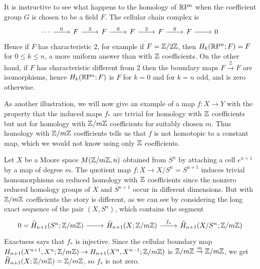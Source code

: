 \begin{example}
It is instructive to see what happens to the homology of $\mathbb{R}\mathrm{P}^n$ when the coefficient group $G$ is chosen to be a field $F$. The cellular chain complex is
\[\begin{tikzcd}
\cdots\ar[r,"0"]&F\ar[r,"2"]&F\ar[r,"0"]&F\ar[r,"2"]&F\ar[r,"0"]&F\ar[r]&0
\end{tikzcd}\]
Hence if $F$ has characteristic $2$, for example if $F=\mathbb{Z}/2\mathbb{Z}$, then $H_k(\mathbb{R}\mathrm{P}^n;F)=F$ for $0\leq k\leq n$, a more uniform answer than with $\mathbb{Z}$ coefficients. On the other hand, if $F$ has characteristic different from $2$ then the boundary maps $F\stackrel{2}{\to}F$ are isomorphisms, hence $H_k(\mathbb{R}\mathrm{P}^n;F)$ is $F$ for $k=0$ and for $k=n$ odd, and is zero otherwise.
\end{example}
As another illustration, we will now give an example of a map $f:X\to Y$ with the property that the induced maps $f_*$ are trivial for homology with $\mathbb{Z}$ coefficients but not for homology with $\mathbb{Z}/m\mathbb{Z}$ coefficients for suitably chosen $m$. Thus homology with $\mathbb{Z}/m\mathbb{Z}$ coefficients tells us that $f$ is not homotopic to a constant map, which we would not know using only $\mathbb{Z}$ coefficients.
\begin{example}
Let $X$ be a Moore space $M(\mathbb{Z}/m\mathbb{Z},n)$ obtained from $S^n$ by attaching a cell $e^{n+1}$ by a map of degree $m$. The quotient map $f:X\to X/S^n=S^{n+1}$ induces trivial homomorphisms on reduced homology with $\mathbb{Z}$ coefficients since the nonzero reduced homology groups of $X$ and $S^{n+1}$ occur in different dimensions. But with $\mathbb{Z}/m\mathbb{Z}$ coefficients the story is different, as we can see by considering the long exact sequence of the pair $(X,S^n)$, which contains the segment
\[\begin{tikzcd}
0=\widetilde{H}_{n+1}(S^n;\Z/m\Z)\ar[r]&\widetilde{H}_{n+1}(X;\Z/m\Z)\ar[r,"f_*"]&\widetilde{H}_{n+1}(X/S^n;\Z/m\Z)
\end{tikzcd}\]
Exactness says that $f_*$ is injective. Since the cellular boundary map $H_{n+1}(X^{n+1},X^n;\mathbb{Z}/m\mathbb{Z})\to H_{n+1}(X^{n},X^{n-1};\mathbb{Z}/m\mathbb{Z})$ is $\mathbb{Z}/m\mathbb{Z}\stackrel{m}{\to}\mathbb{Z}/m\mathbb{Z}$, we get $\widetilde{H}_{n+1}(X;\mathbb{Z}/m\mathbb{Z})=\mathbb{Z}/m\mathbb{Z}$, so $f_*$ is not zero.
\end{example}
